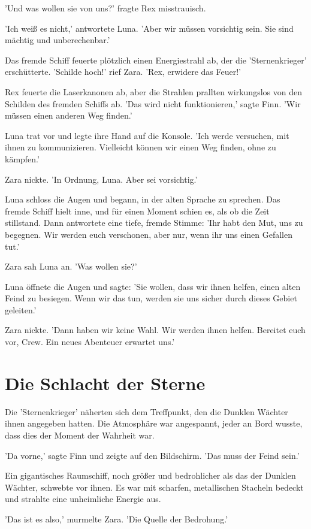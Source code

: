 \documentclass[12pt]{article}
\begin{document}
'Und was wollen sie von uns?' fragte Rex misstrauisch.

'Ich weiß es nicht,' antwortete Luna. 'Aber wir müssen vorsichtig sein. Sie sind mächtig und unberechenbar.'

Das fremde Schiff feuerte plötzlich einen Energiestrahl ab, der die 'Sternenkrieger' erschütterte. 'Schilde hoch!' rief Zara. 'Rex, erwidere das Feuer!'

Rex feuerte die Laserkanonen ab, aber die Strahlen prallten wirkungslos von den Schilden des fremden Schiffs ab. 'Das wird nicht funktionieren,' sagte Finn. 'Wir müssen einen anderen Weg finden.'

Luna trat vor und legte ihre Hand auf die Konsole. 'Ich werde versuchen, mit ihnen zu kommunizieren. Vielleicht können wir einen Weg finden, ohne zu kämpfen.'

Zara nickte. 'In Ordnung, Luna. Aber sei vorsichtig.'

Luna schloss die Augen und begann, in der alten Sprache zu sprechen. Das fremde Schiff hielt inne, und für einen Moment schien es, als ob die Zeit stillstand. Dann antwortete eine tiefe, fremde Stimme: 'Ihr habt den Mut, uns zu begegnen. Wir werden euch verschonen, aber nur, wenn ihr uns einen Gefallen tut.'

Zara sah Luna an. 'Was wollen sie?'

Luna öffnete die Augen und sagte: 'Sie wollen, dass wir ihnen helfen, einen alten Feind zu besiegen. Wenn wir das tun, werden sie uns sicher durch dieses Gebiet geleiten.'

Zara nickte. 'Dann haben wir keine Wahl. Wir werden ihnen helfen. Bereitet euch vor, Crew. Ein neues Abenteuer erwartet uns.'

\section{ Die Schlacht der Sterne }
 Die 'Sternenkrieger' näherten sich dem Treffpunkt, den die Dunklen Wächter ihnen angegeben hatten. Die Atmosphäre war angespannt, jeder an Bord wusste, dass dies der Moment der Wahrheit war.

'Da vorne,' sagte Finn und zeigte auf den Bildschirm. 'Das muss der Feind sein.'

Ein gigantisches Raumschiff, noch größer und bedrohlicher als das der Dunklen Wächter, schwebte vor ihnen. Es war mit scharfen, metallischen Stacheln bedeckt und strahlte eine unheimliche Energie aus.

'Das ist es also,' murmelte Zara. 'Die Quelle der Bedrohung.'
\end{document}
